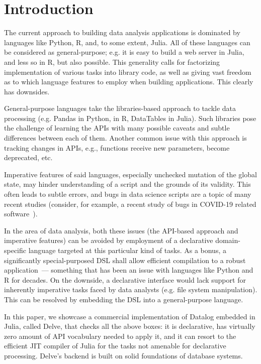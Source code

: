 \section{Introduction}

The current approach to building data analysis applications is
dominated by languages like Python, R, and, to some extent, Julia.
All of these languages can be considered as general-purpose; e.g. it is easy
to build a web server in Julia, and less so in R, but also possible.
This generality calls for factorizing implementation of various tasks into
library code, as well as giving vast freedom as to which language
features to employ when building applications. This clearly has downsides.

General-purpose languages take the libraries-based approach to tackle
data processing (e.g. Pandas in Python, \dplyr in R, DataTables in Julia).
Such libraries pose the challenge of learning the APIs with many possible
caveats and subtle differences between each of them.
Another common issue with this approach is tracking changes in APIs, e.g.,
functions receive new parameters, become deprecated, etc.

Imperative features of said languages, especially unchecked mutation
of the global state, may hinder understanding of a script and the grounds
of its validity. This often leads to subtle errors, and bugs in data science
scripts are a topic of many recent studies
(consider, for example, a recent study of bugs in COVID-19 related software~\cite{bugscovid}).

In the area of data analysis,
both these issues (the API-based approach and imperative features)
can be avoided by employment of a declarative
domain-specific language targeted at this particular kind of tasks.
As a bonus, a significantly special-purposed DSL shall
allow efficient compilation to a robust application~--- something that
has been an issue with languages like Python and R for decades.
On the downside, a declarative interface would lack support
for inherently imperative tasks faced by data analysts  (e.g. file system manipulation).
This can be resolved by embedding the DSL into a general-purpose
language.

In this paper, we showcase a commercial implementation of Datalog
embedded in Julia, called Delve, that checks all the above boxes: it is declarative,
has virtually zero amount of API vocabulary needed to apply it,
and it can resort to the efficient JIT compiler of Julia for the tasks
not amenable for declarative processing. Delve's backend is built on solid
foundations of database systems.

